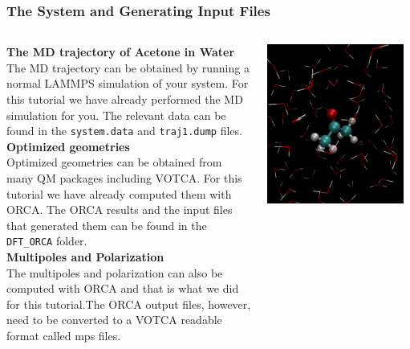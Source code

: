 \documentclass[t,aspectratio=169, 8pt]{beamer}
\begin{document}
\begin{frame}[fragile]
  \frametitle{The System and Generating Input Files}
  \begin{columns}[b]
    \begin{column}{0.58\textwidth}
  \textbf{The MD trajectory of Acetone in Water}\\
  The MD trajectory can be obtained by running a normal LAMMPS simulation of your system. For this tutorial we have already performed the MD simulation for you. The relevant data can be found in the \texttt{system.data} and \texttt{traj1.dump} files.
  \vspace{0.3cm}\\
  \textbf{Optimized geometries}\\
  Optimized geometries can be obtained from many QM packages including VOTCA. For this tutorial we have already computed them with ORCA. The ORCA results and the input files that generated them can be found in the \texttt{DFT_ORCA} folder. 
  \vspace{0.3cm}\\
  \textbf{Multipoles and Polarization}\\
  The multipoles and polarization can also be computed with ORCA and that is what we did for this tutorial.The ORCA output files, however, need to be converted to a VOTCA readable format called mps files. 
\end{column}
\begin{column}{0.4\textwidth}
\includegraphics[width=0.95\textwidth]{system}
\end{column}
\end{columns}
\end{frame}
\end{document}
